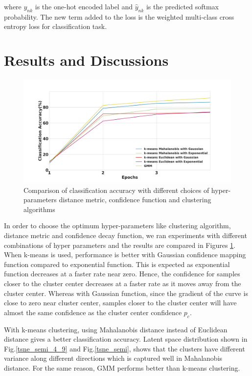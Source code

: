 \documentclass[runningheads]{llncs}
\begin{document}
where $y_{nk}$ is the one-hot encoded label and $\hat{y}_{nk}$ is the predicted softmax probability.
The new term added to the loss is the weighted multi-class cross entropy loss for classification task.

\section{Results and Discussions}

\begin{figure}
\centering
  \centering
  \includegraphics[width=.6\linewidth]{images/classification_accuracy_hyperparameter}
\caption{Comparison of classification accuracy with different choices of hyper-parameters distance metric, confidence function and clustering algorithms}
\label{classification_acc}
\end{figure}

In order to choose the optimum hyper-parameters like clustering algorithm, distance metric and confidence decay function, we ran experiments with different combinations of hyper parameters and the results are compared in Figures \ref{classification_acc}.
When k-means is used, performance is better with Gaussian confidence mapping function compared to exponential function.
This is expected as exponential function decreases at a faster rate near zero.
Hence, the confidence for samples closer to the cluster center decreases at a faster rate as it moves away from the cluster center.
Whereas  with Gaussian function, since the gradient of the curve is close to zero near cluster center, samples closer to the cluster center will have almost the same confidence as the cluster center confidence $p_c$.

With k-means clustering, using Mahalanobis distance instead of Euclidean distance gives a better classification accuracy.
Latent space distribution shown in Fig.\ref{tsne_semi_4_9} and Fig.\ref{tsne_semi}, shows that the clusters have different variance along different directions which is captured well in Mahalanobis distance.
For the same reason, GMM performs better than k-means clustering.
\end{document}
